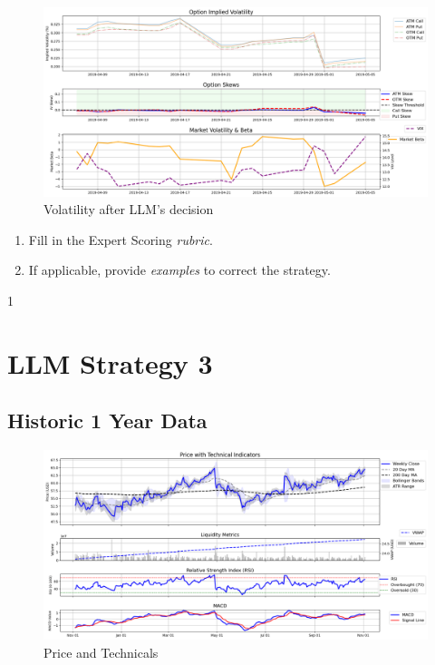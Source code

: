 \documentclass[8pt]{scrartcl}
\begin{document}
\begin{figure}[H]
    \centering
    \includegraphics[width=1\linewidth]{judge_reviews/AAPL_M_gpt-4o-mini/2019-04-07/llm_Market_Volatility_&_Beta.png}
    \caption{Volatility after LLM's decision}
\end{figure}

\begin{tcolorbox}[colback=blue!10, colframe=blue!60, title=\textbf{TASKS}, sharp corners=southwest]
\begin{enumerate}
    \item Fill in the Expert Scoring \textit{rubric}.
    \item If applicable, provide \textit{examples} to correct the strategy.
\end{enumerate}
\end{tcolorbox}
\newpage


1\section*{LLM Strategy 3}
\label{app:s3}

\subsection*{Historic 1 Year Data}

\begin{figure}[H]
    \centering
    \includegraphics[width=1\linewidth]{judge_reviews//GOOGL_M_gpt-4o-mini/2019-11-04/judge_Price_with_Technical_Indicators.png}
    \caption{Price and Technicals}
\end{figure}
\end{document}
